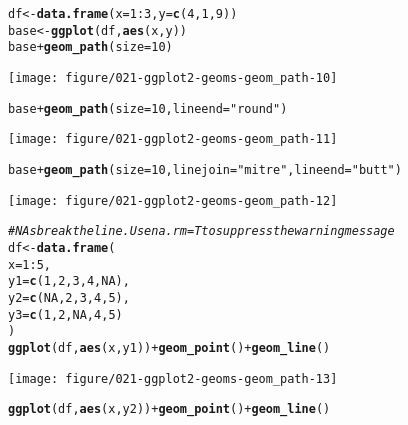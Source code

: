 \documentclass[a4paper,titlepage]{tufte-handout}\usepackage[]{graphicx}\usepackage[]{color}
\makeatletter
\def\maxwidth{ %
  \ifdim\Gin@nat@width>\linewidth
    \linewidth
  \else
    \Gin@nat@width
  \fi
}
\newcommand{\hlnum}[1]{\textcolor[rgb]{0.686,0.059,0.569}{#1}}%
\newcommand{\hlstr}[1]{\textcolor[rgb]{0.192,0.494,0.8}{#1}}%
\newcommand{\hlcom}[1]{\textcolor[rgb]{0.678,0.584,0.686}{\textit{#1}}}%
\newcommand{\hlopt}[1]{\textcolor[rgb]{0,0,0}{#1}}%
\newcommand{\hlstd}[1]{\textcolor[rgb]{0.345,0.345,0.345}{#1}}%
\newcommand{\hlkwb}[1]{\textcolor[rgb]{0.69,0.353,0.396}{#1}}%
\newcommand{\hlkwc}[1]{\textcolor[rgb]{0.333,0.667,0.333}{#1}}%
\newcommand{\hlkwd}[1]{\textcolor[rgb]{0.737,0.353,0.396}{\textbf{#1}}}%
\newenvironment{kframe}{%
 \def\at@end@of@kframe{}%
 \ifinner\ifhmode%
  \def\at@end@of@kframe{\end{minipage}}%
  \begin{minipage}{\columnwidth}%
 \fi\fi%
 \def\FrameCommand##1{\hskip\@totalleftmargin \hskip-\fboxsep
 \colorbox{shadecolor}{##1}\hskip-\fboxsep
     \hskip-\linewidth \hskip-\@totalleftmargin \hskip\columnwidth}%
 \MakeFramed {\advance\hsize-\width
   \@totalleftmargin\z@ \linewidth\hsize
   \@setminipage}}%
 {\par\unskip\endMakeFramed%
 \at@end@of@kframe}
\newenvironment{knitrout}{}{} %
\makeatother
\begin{document}
\begin{knitrout}
\begin{kframe}
\begin{alltt}
\hlstd{df} \hlkwb{<-} \hlkwd{data.frame}\hlstd{(}\hlkwc{x} \hlstd{=} \hlnum{1}\hlopt{:}\hlnum{3}\hlstd{,} \hlkwc{y} \hlstd{=} \hlkwd{c}\hlstd{(}\hlnum{4}\hlstd{,} \hlnum{1}\hlstd{,} \hlnum{9}\hlstd{))}
\hlstd{base} \hlkwb{<-} \hlkwd{ggplot}\hlstd{(df,} \hlkwd{aes}\hlstd{(x, y))}
\hlstd{base} \hlopt{+} \hlkwd{geom_path}\hlstd{(}\hlkwc{size} \hlstd{=} \hlnum{10}\hlstd{)}
\end{alltt}
\end{kframe}
\texttt{[image: figure/021-ggplot2-geoms-geom\_path-10]} 
\begin{kframe}\begin{alltt}
\hlstd{base} \hlopt{+} \hlkwd{geom_path}\hlstd{(}\hlkwc{size} \hlstd{=} \hlnum{10}\hlstd{,} \hlkwc{lineend} \hlstd{=} \hlstr{"round"}\hlstd{)}
\end{alltt}
\end{kframe}
\texttt{[image: figure/021-ggplot2-geoms-geom\_path-11]} 
\begin{kframe}\begin{alltt}
\hlstd{base} \hlopt{+} \hlkwd{geom_path}\hlstd{(}\hlkwc{size} \hlstd{=} \hlnum{10}\hlstd{,} \hlkwc{linejoin} \hlstd{=} \hlstr{"mitre"}\hlstd{,} \hlkwc{lineend} \hlstd{=} \hlstr{"butt"}\hlstd{)}
\end{alltt}
\end{kframe}
\texttt{[image: figure/021-ggplot2-geoms-geom\_path-12]} 
\begin{kframe}\begin{alltt}
\hlcom{# NAs break the line. Use na.rm = T to suppress the warning message}
\hlstd{df} \hlkwb{<-} \hlkwd{data.frame}\hlstd{(}
  \hlkwc{x} \hlstd{=} \hlnum{1}\hlopt{:}\hlnum{5}\hlstd{,}
  \hlkwc{y1} \hlstd{=} \hlkwd{c}\hlstd{(}\hlnum{1}\hlstd{,} \hlnum{2}\hlstd{,} \hlnum{3}\hlstd{,} \hlnum{4}\hlstd{,} \hlnum{NA}\hlstd{),}
  \hlkwc{y2} \hlstd{=} \hlkwd{c}\hlstd{(}\hlnum{NA}\hlstd{,} \hlnum{2}\hlstd{,} \hlnum{3}\hlstd{,} \hlnum{4}\hlstd{,} \hlnum{5}\hlstd{),}
  \hlkwc{y3} \hlstd{=} \hlkwd{c}\hlstd{(}\hlnum{1}\hlstd{,} \hlnum{2}\hlstd{,} \hlnum{NA}\hlstd{,} \hlnum{4}\hlstd{,} \hlnum{5}\hlstd{)}
\hlstd{)}
\hlkwd{ggplot}\hlstd{(df,} \hlkwd{aes}\hlstd{(x, y1))} \hlopt{+} \hlkwd{geom_point}\hlstd{()} \hlopt{+} \hlkwd{geom_line}\hlstd{()}
\end{alltt}


{\ttfamily\noindent\color{warningcolor}{\#\# Warning: Removed 1 rows containing missing values (geom\_point).}}

{\ttfamily\noindent\color{warningcolor}{\#\# Warning: Removed 1 rows containing missing values (geom\_path).}}\end{kframe}
\texttt{[image: figure/021-ggplot2-geoms-geom\_path-13]} 
\begin{kframe}\begin{alltt}
\hlkwd{ggplot}\hlstd{(df,} \hlkwd{aes}\hlstd{(x, y2))} \hlopt{+} \hlkwd{geom_point}\hlstd{()} \hlopt{+} \hlkwd{geom_line}\hlstd{()}
\end{alltt}



\end{kframe}
\end{knitrout}
\end{document}
